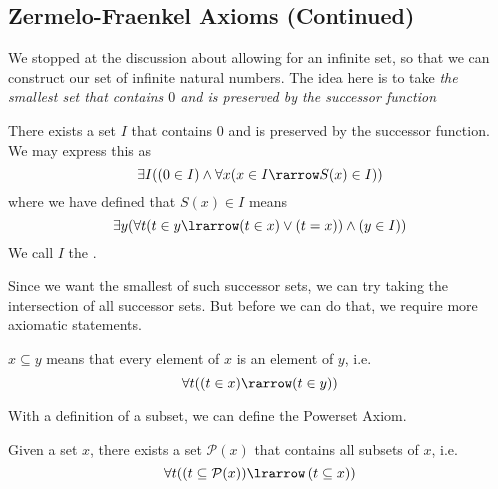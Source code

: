 \documentclass[notoc,notitlepage]{tufte-book}
\begin{document}
\subsection{Zermelo-Fraenkel Axioms (Continued)}%
\label{sub:zermelo_fraenkel_axioms_continued}

We stopped at the discussion about allowing for an infinite set, so that we can construct our set of infinite natural numbers. The idea here is to take \textit{the smallest set that contains $0$ and is preserved by the successor function}

\begin{axiom}
\label{axiom:infinity_axiom}
  There exists a set $I$ that contains $0$ and is preserved by the successor function. We may express this as
  \begin{equation*}
    \exists I ( ( 0 \in I ) \land \forall x ( x \in I \rarrow S(x) \in I ) )
  \end{equation*}
  where we have defined that $S(x) \in I$ means
  \begin{equation*}
    \exists y ( \forall t ( t \in y \lrarrow (t \in x) \lor ( t = x ) ) \land (y \in I) )
  \end{equation*}
  We call $I$ the .
\end{axiom}

Since we want the smallest of such successor sets, we can try taking the intersection of all successor sets. But before we can do that, we require more axiomatic statements.

\begin{defn}[Subsets]
\label{defn:subsets}
  $x \subseteq y$ means that every element of $x$ is an element of $y$, i.e.
  \begin{equation*}
    \forall t ( ( t \in x ) \rarrow ( t \in y ) )
  \end{equation*}
\end{defn}

With a definition of a subset, we can define the Powerset Axiom.

\begin{axiom}
\label{axiom:powerset_axiom}
  Given a set $x$, there exists a set $\mathcal{P}(x)$ that contains all subsets of $x$, i.e.
  \begin{equation*}
    \forall t ( ( t \subseteq \mathcal{P}(x) ) \lrarrow \left( t \subseteq x \right) )
  \end{equation*}
\end{axiom}
\end{document}
